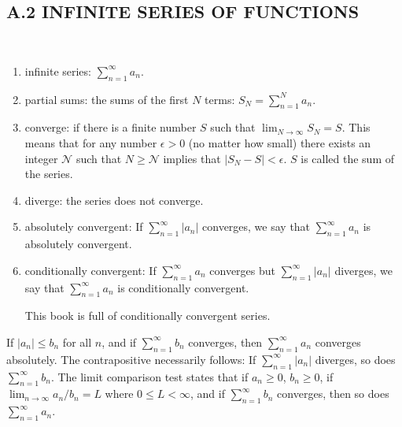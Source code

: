 \documentclass[hazy,blue,11pt]{elegantnote}
\begin{document}
\subsection{A.2 INFINITE SERIES OF FUNCTIONS}
\begin{definition}
~\\
    \begin{enumerate}
        \item infinite series: $\sum_{n=1}^{\infty}a_n$.
        \item partial sums: the sums of the first $N$ terms: $S_N=\sum_{n=1}^N a_n$.
        \item converge: if there is a finite number $S$ such that $\lim_{N \to \infty}S_N=S$. This means that for any number $\epsilon > 0$ (no matter how small) there exists an integer $\mathcal{N}$ such that $N \ge \mathcal{N}$ implies that $|S_N-S|<\epsilon$. $S$ is called the sum of the series.
        \item diverge: the series does not converge.
        \item absolutely convergent: If $\sum_{n=1}^{\infty}|a_{n}|$ converges, we say that $\sum_{n=1}^{\infty}a_{n}$ is absolutely convergent.
        \item conditionally convergent: If $\sum_{n=1}^{\infty}a_{n}$ converges but $\sum_{n=1}^{\infty}|a_{n}|$ diverges, we say that $\sum_{n=1}^{\infty}a_{n}$ is conditionally convergent.
        \begin{note}
            This book is full of conditionally convergent series.
        \end{note}
    \end{enumerate}    
\end{definition}

\begin{theorem}
    If  $\left|a_n\right| \le b_n$ for all $n$, and if $\sum_{n=1}^{\infty} b_n$ converges, then $\sum_{n=1}^{\infty} a_n$ converges absolutely. The contrapositive necessarily follows: If $\sum_{n=1}^{\infty}\left|a_n\right|$ diverges, so does $\sum_{n=1}^{\infty} b_n$. The limit comparison test states that if $a_n \ge 0$, $b_n \ge 0$, if $\lim _{n \rightarrow \infty} a_n / b_n=L$ where $0 \le L<\infty$, and if $\sum_{n=1}^{\infty} b_n$ converges, then so does $\sum_{n=1}^{\infty} a_n$.
\end{theorem}
\end{document}
